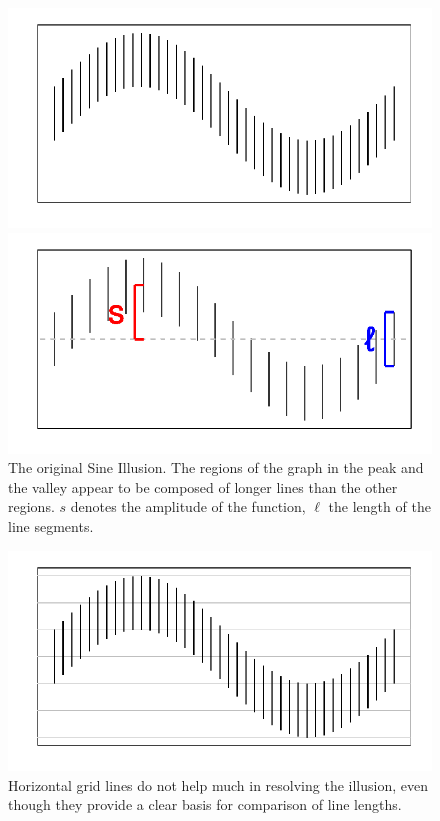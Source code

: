 \documentclass[11pt]{article}\usepackage{graphicx, color}
\makeatletter
\def\maxwidth{ %
  \ifdim\Gin@nat@width>\linewidth
    \linewidth
  \else
    \Gin@nat@width
  \fi
}
\makeatother
\begin{document}
\begin{figure}[hbtp]
\centering
\begin{minipage}{.495\textwidth}


{\centering \includegraphics[width=\maxwidth]{figure/fig-original} 

}




\end{minipage}\begin{minipage}{.495\textwidth}


\includegraphics[keepaspectratio=true, width=\linewidth]{fig-original-redo.pdf}
\end{minipage}
\caption{\label{original}The original Sine Illusion. The regions of the graph in the peak and the valley appear to be composed of longer lines than the other regions. $s$ denotes the amplitude of the function, $\ell$ the length of the line segments.}
\end{figure}

\begin{figure}[hbtp]
\centering


{\centering \includegraphics[width=.5\linewidth]{figure/fig-originalgrid} 

}




\caption{\label{originalgrid} Horizontal grid lines do not help much in resolving the illusion, even though they provide a clear basis for comparison of line lengths.}
\end{figure}
\end{document}
